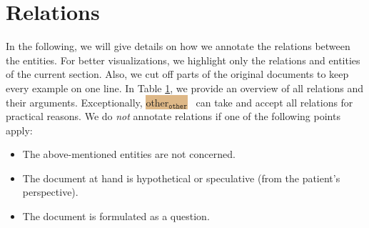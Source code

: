 \documentclass[12pt]{article}
\theoremstyle{definition}
\newcommand{\other}[1]{\colorbox{burlywood}{#1$_{\texttt{other}}$}\ }
\begin{document}
\section{Relations}\label{sec:relations}

In the following, we will give details on how we annotate the relations between the entities.
For better visualizations, we highlight only the relations and entities of the current section.
Also, we cut off parts of the original documents to keep every example on one line.
In Table \ref{sec:relations}, we provide an overview of all relations and their arguments.
Exceptionally, \other{other} can take and accept all relations for practical reasons.
We do \emph{not} annotate relations if one of the following points apply:

\begin{itemize}
    \item The above-mentioned entities are not concerned.
    \item The document at hand is hypothetical or speculative (from the patient's perspective).
    \item The document is formulated as a question.
\end{itemize}
\end{document}
